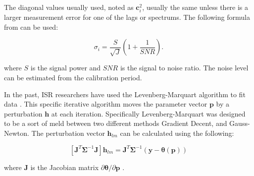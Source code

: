 %
%



The diagonal values usually used, noted as $\mathbf{c}_i^2$, usually the same unless there is a larger measurement error for one of the lags or spectrums. The following formula from  \cite{nicollsisrschool2013} can be used:

\begin{equation}
\label{sigpow}
\sigma_i = \frac{S}{\sqrt{J}}\left(1+\frac{1}{SNR}\right).
\end{equation}

\noindent where $S$ is the signal power and $SNR$ is the signal to noise ratio. The noise level can be estimated from the calibration period. 

In the past, ISR researchers have used the Levenberg-Marquart algorithm to fit data \cite{nikoukar2008}. This specific iterative algorithm moves the parameter vector $\mathbf{p}$ by a perturbation $\mathbf{h}$ at each iteration\cite{gavin:2013}. Specifically Levenberg-Marquart was designed to be a sort of meld between two different methods Gradient Decent, and Gauss-Newton. The perturbation vector $\mathbf{h}_{lm}$ can be calculated using the following:

\begin{equation}
\left[ \mathbf{J}^T\bm{\Sigma}^{-1}\mathbf{J}\right]\mathbf{h}_{lm} =\mathbf{J}^T\bm{\Sigma}^{-1}(\mathbf{y}-\bm{\theta}(\mathbf{p}))
\label{hlm}
\end{equation}

\noindent where $\mathbf{J}$ is the Jacobian matrix $\partial \bm{\theta}/\partial \mathbf{p}$ \cite{levenberg1944,marquardt:1963}. 

